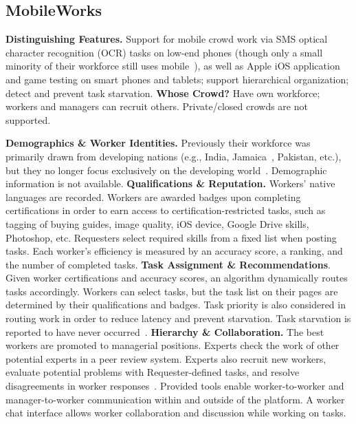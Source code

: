 \documentclass{sigchi}
\begin{document}
\subsection{MobileWorks}

{\bf Distinguishing Features.} Support for mobile crowd work via SMS optical character recognition (OCR) tasks on low-end phones (though only a small minority of their workforce still uses mobile~\cite{mw-kulkarni13}), as well as Apple iOS application and game testing on smart phones and tablets; support hierarchical organization; detect and prevent task starvation. 
{\bf Whose Crowd?} Have own workforce; workers and managers can recruit others. Private/closed crowds are not supported.

{\bf Demographics \& Worker Identities.} Previously their workforce was primarily drawn from developing nations (e.g., India, Jamaica~\cite{MWJamaica}, Pakistan, etc.), but they no longer focus exclusively on the developing world~\cite{mw-kulkarni13}. Demographic information is not available. 
{\bf Qualifications \& Reputation.} Workers' native languages are recorded. Workers are awarded badges upon completing certifications in order to earn access to certification-restricted tasks, such as tagging of buying guides, image quality, iOS device, Google Drive skills, Photoshop, etc. Requesters select required skills from a fixed list when posting tasks. Each worker's efficiency is measured by an accuracy score, a ranking, and the number of completed tasks. 
{\bf Task Assignment \& Recommendations}. Given worker certifications and accuracy scores, an algorithm dynamically routes tasks accordingly. Workers can select tasks, but the task list on their pages are determined by their qualifications and badges. Task priority is also considered in routing work in order to reduce latency and prevent starvation. Task starvation is reported to have never occurred~\cite{Kulkarni12}. 
{\bf Hierarchy \& Collaboration.} The best workers are promoted to managerial positions. Experts check the work of other potential experts in a peer review system. Experts also recruit new workers, evaluate potential problems with Requester-defined tasks, and resolve disagreements in worker responses~\cite{Kulkarni12}.
Provided tools enable worker-to-worker and manager-to-worker communication within and outside of the platform. A worker chat interface allows worker collaboration and discussion while working on tasks. 
\end{document}

